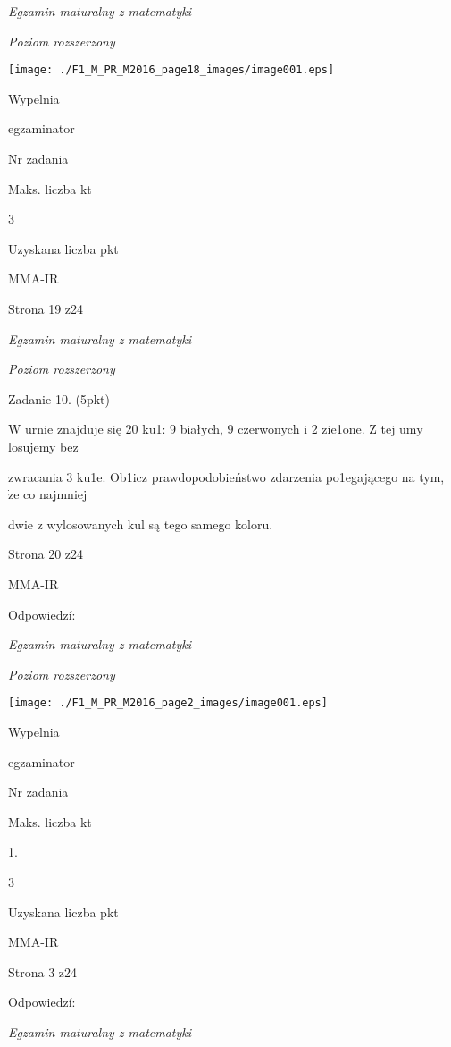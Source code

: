 \documentclass[a4paper,12pt]{article}
\begin{document}
{\it Egzamin maturalny z matematyki}

{\it Poziom rozszerzony}
\begin{center}
\texttt{[image: ./F1\_M\_PR\_M2016\_page18\_images/image001.eps]}
\end{center}
Wypelnia

egzaminator

Nr zadania

Maks. liczba kt

3

Uzyskana liczba pkt

MMA-IR

Strona 19 z24





{\it Egzamin maturalny z matematyki}

{\it Poziom rozszerzony}

Zadanie 10. (5pkt)

$\mathrm{W}$ urnie znajduje się 20 ku1: 9 białych, 9 czerwonych i 2 zie1one. $\mathrm{Z}$ tej umy losujemy bez

zwracania 3 ku1e. Ob1icz prawdopodobieństwo zdarzenia po1egającego na tym, $\dot{\mathrm{z}}\mathrm{e}$ co najmniej

dwie z wylosowanych kul są tego samego koloru.

Strona 20 z24

MMA-IR





Odpowiedzí:

{\it Egzamin maturalny z matematyki}

{\it Poziom rozszerzony}
\begin{center}
\texttt{[image: ./F1\_M\_PR\_M2016\_page2\_images/image001.eps]}
\end{center}
Wypelnia

egzaminator

Nr zadania

Maks. liczba kt

1.

3

Uzyskana liczba pkt

MMA-IR

Strona 3 z24





Odpowiedzí:

{\it Egzamin maturalny z matematyki}
\end{document}
